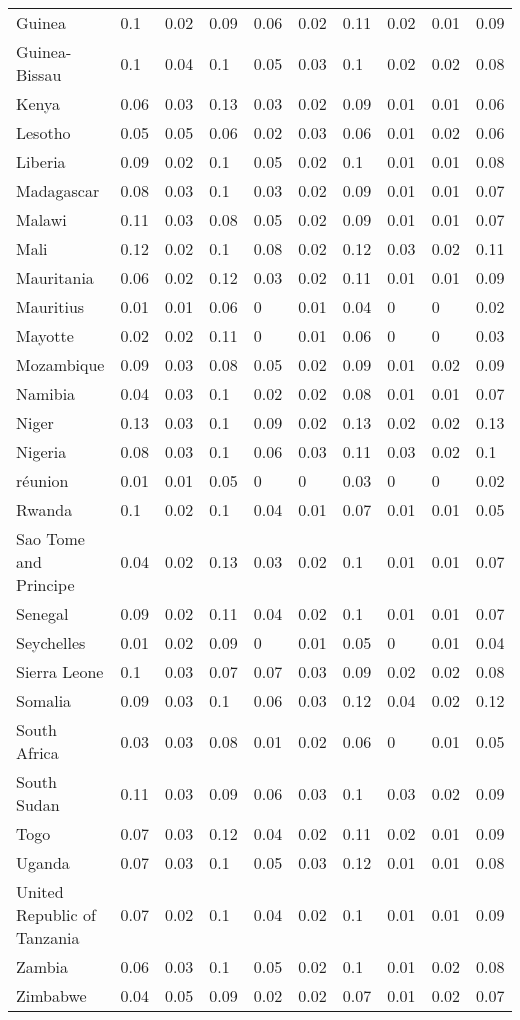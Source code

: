 \begin{longtable}[t]{llllllllll}
Guinea & 0.1 & 0.02 & 0.09 & 0.06 & 0.02 & 0.11 & 0.02 & 0.01 & 0.09\\
Guinea-Bissau & 0.1 & 0.04 & 0.1 & 0.05 & 0.03 & 0.1 & 0.02 & 0.02 & 0.08\\
Kenya & 0.06 & 0.03 & 0.13 & 0.03 & 0.02 & 0.09 & 0.01 & 0.01 & 0.06\\
Lesotho & 0.05 & 0.05 & 0.06 & 0.02 & 0.03 & 0.06 & 0.01 & 0.02 & 0.06\\
Liberia & 0.09 & 0.02 & 0.1 & 0.05 & 0.02 & 0.1 & 0.01 & 0.01 & 0.08\\
Madagascar & 0.08 & 0.03 & 0.1 & 0.03 & 0.02 & 0.09 & 0.01 & 0.01 & 0.07\\
Malawi & 0.11 & 0.03 & 0.08 & 0.05 & 0.02 & 0.09 & 0.01 & 0.01 & 0.07\\
Mali & 0.12 & 0.02 & 0.1 & 0.08 & 0.02 & 0.12 & 0.03 & 0.02 & 0.11\\
Mauritania & 0.06 & 0.02 & 0.12 & 0.03 & 0.02 & 0.11 & 0.01 & 0.01 & 0.09\\
Mauritius & 0.01 & 0.01 & 0.06 & 0 & 0.01 & 0.04 & 0 & 0 & 0.02\\
Mayotte & 0.02 & 0.02 & 0.11 & 0 & 0.01 & 0.06 & 0 & 0 & 0.03\\
Mozambique & 0.09 & 0.03 & 0.08 & 0.05 & 0.02 & 0.09 & 0.01 & 0.02 & 0.09\\
Namibia & 0.04 & 0.03 & 0.1 & 0.02 & 0.02 & 0.08 & 0.01 & 0.01 & 0.07\\
Niger & 0.13 & 0.03 & 0.1 & 0.09 & 0.02 & 0.13 & 0.02 & 0.02 & 0.13\\
Nigeria & 0.08 & 0.03 & 0.1 & 0.06 & 0.03 & 0.11 & 0.03 & 0.02 & 0.1\\
réunion & 0.01 & 0.01 & 0.05 & 0 & 0 & 0.03 & 0 & 0 & 0.02\\
Rwanda & 0.1 & 0.02 & 0.1 & 0.04 & 0.01 & 0.07 & 0.01 & 0.01 & 0.05\\
Sao Tome and Principe & 0.04 & 0.02 & 0.13 & 0.03 & 0.02 & 0.1 & 0.01 & 0.01 & 0.07\\
Senegal & 0.09 & 0.02 & 0.11 & 0.04 & 0.02 & 0.1 & 0.01 & 0.01 & 0.07\\
Seychelles & 0.01 & 0.02 & 0.09 & 0 & 0.01 & 0.05 & 0 & 0.01 & 0.04\\
Sierra Leone & 0.1 & 0.03 & 0.07 & 0.07 & 0.03 & 0.09 & 0.02 & 0.02 & 0.08\\
Somalia & 0.09 & 0.03 & 0.1 & 0.06 & 0.03 & 0.12 & 0.04 & 0.02 & 0.12\\
South Africa & 0.03 & 0.03 & 0.08 & 0.01 & 0.02 & 0.06 & 0 & 0.01 & 0.05\\
South Sudan & 0.11 & 0.03 & 0.09 & 0.06 & 0.03 & 0.1 & 0.03 & 0.02 & 0.09\\
Togo & 0.07 & 0.03 & 0.12 & 0.04 & 0.02 & 0.11 & 0.02 & 0.01 & 0.09\\
Uganda & 0.07 & 0.03 & 0.1 & 0.05 & 0.03 & 0.12 & 0.01 & 0.01 & 0.08\\
United Republic of Tanzania & 0.07 & 0.02 & 0.1 & 0.04 & 0.02 & 0.1 & 0.01 & 0.01 & 0.09\\
Zambia & 0.06 & 0.03 & 0.1 & 0.05 & 0.02 & 0.1 & 0.01 & 0.02 & 0.08\\
Zimbabwe & 0.04 & 0.05 & 0.09 & 0.02 & 0.02 & 0.07 & 0.01 & 0.02 & 0.07\\*
\end{longtable}
\endgroup{}
